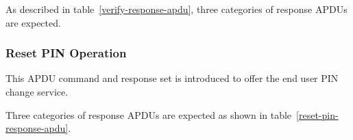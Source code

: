 As described in table~\ref{verify-response-apdu}, three categories of response APDUs are expected.

\begin{table}[!htb]
\caption{Verify PIN Response APDU}
\label{verify-response-apdu}
\end{table}

\subsubsection{Reset PIN Operation}
This APDU command and response set is introduced to offer the end user PIN change service.

\begin{table}[!htb]
\caption{Reset PIN command }
\label{reset-pin-command-apdu}
\end{table}

Three categories of response APDUs are expected as shown in table~\ref{reset-pin-response-apdu}.
\begin{table}[!htb]
\caption{Reset PIN Response APDU}
\label{reset-pin-response-apdu}
\end{table}


